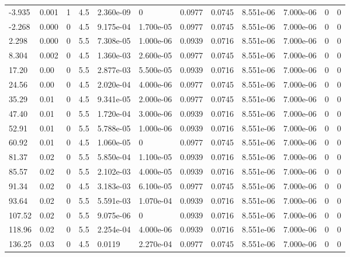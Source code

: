 \documentclass[preview]{standalone}
\begin{document}
{{\begin{tabular}{L{1.2cm}C{1.2cm} C{0.3cm}C{0.5cm} C{1.4cm}C{1.4cm} C{1.4cm}C{1.4cm} C{1.6cm}C{1.6cm} C{1.6cm}C{1.6cm}}
  -3.935  &  0.001  & 1     & 4.5 &  2.360e-09  & 0  &  0.0977&   0.0745& 8.551e-06 & 7.000e-06   &  0 & 0  \\ 
  -2.268  &  0.000  & 0     & 4.5 &  9.175e-04  & 1.700e-05  &  0.0977&   0.0745& 8.551e-06 & 7.000e-06   &  0 & 0  \\ 
  2.298  &  0.000  & 0     & 5.5 &  7.308e-05  & 1.000e-06  &  0.0939&   0.0716& 8.551e-06 & 7.000e-06   &  0 & 0  \\ 
  8.304  &  0.002  & 0     & 4.5 &  1.360e-03  & 2.600e-05  &  0.0977&   0.0745& 8.551e-06 & 7.000e-06   &  0 & 0  \\ 
  17.20  &  0.00  & 0     & 5.5 &  2.877e-03  & 5.500e-05  &  0.0939&   0.0716& 8.551e-06 & 7.000e-06   &  0 & 0  \\ 
  24.56  &  0.00  & 0     & 4.5 &  2.020e-04  & 4.000e-06  &  0.0977&   0.0745& 8.551e-06 & 7.000e-06   &  0 & 0  \\ 
  35.29  &  0.01  & 0     & 4.5 &  9.341e-05  & 2.000e-06  &  0.0977&   0.0745& 8.551e-06 & 7.000e-06   &  0 & 0  \\ 
  47.40  &  0.01  & 0     & 5.5 &  1.720e-04  & 3.000e-06  &  0.0939&   0.0716& 8.551e-06 & 7.000e-06   &  0 & 0  \\ 
  52.91  &  0.01  & 0     & 5.5 &  5.788e-05  & 1.000e-06  &  0.0939&   0.0716& 8.551e-06 & 7.000e-06   &  0 & 0  \\ 
  60.92  &  0.01  & 0     & 4.5 &  1.060e-05  & 0  &  0.0977&   0.0745& 8.551e-06 & 7.000e-06   &  0 & 0  \\ 
  81.37  &  0.02  & 0     & 5.5 &  5.850e-04  & 1.100e-05  &  0.0939&   0.0716& 8.551e-06 & 7.000e-06   &  0 & 0  \\ 
  85.57  &  0.02  & 0     & 5.5 &  2.102e-03  & 4.000e-05  &  0.0939&   0.0716& 8.551e-06 & 7.000e-06   &  0 & 0  \\ 
  91.34  &  0.02  & 0     & 4.5 &  3.183e-03  & 6.100e-05  &  0.0977&   0.0745& 8.551e-06 & 7.000e-06   &  0 & 0  \\ 
  93.64  &  0.02  & 0     & 5.5 &  5.591e-03  & 1.070e-04  &  0.0939&   0.0716& 8.551e-06 & 7.000e-06   &  0 & 0  \\ 
  107.52  &  0.02  & 0     & 5.5 &  9.075e-06  & 0  &  0.0939&   0.0716& 8.551e-06 & 7.000e-06   &  0 & 0  \\ 
  118.96  &  0.02  & 0     & 5.5 &  2.254e-04  & 4.000e-06  &  0.0939&   0.0716& 8.551e-06 & 7.000e-06   &  0 & 0  \\ 
  136.25  &  0.03  & 0     & 4.5 &  0.0119  & 2.270e-04  &  0.0977&   0.0745& 8.551e-06 & 7.000e-06   &  0 & 0  \\ 

\end{tabular}}}
\end{document}
